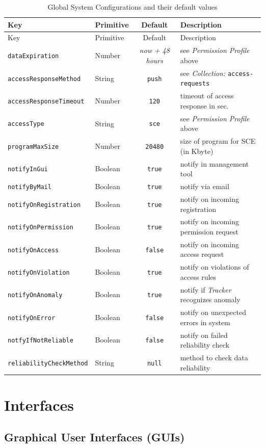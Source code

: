 \documentclass[12pt,english,a4paper,titlepage,cleardoublepage=empty,dottedtoc]{report}
\begin{document}
\begin{longtable}[]{@{}llcl@{}}
\caption{Global System Configurations and their default values
\label{tbl:spec_system-default-config}}\tabularnewline
\toprule
Key & Primitive & Default & Description\tabularnewline
\midrule
\endfirsthead
\toprule
Key & Primitive & Default & Description\tabularnewline
\midrule
\endhead
\texttt{dataExpiration} & Number & \emph{now + 48 hours} & see
\emph{Permission Profile} above\tabularnewline
\texttt{accessResponseMethod} & String &
\texttt{\textquotesingle{}push\textquotesingle{}} & see
\emph{Collection:} \texttt{access-requests}\tabularnewline
\texttt{accessResponseTimeout} & Number & \texttt{120} & timeout of
access response in sec.\tabularnewline
\texttt{accessType} & String &
\texttt{\textquotesingle{}sce\textquotesingle{}} & see \emph{Permission
Profile} above\tabularnewline
\texttt{programMaxSize} & Number & \texttt{20480} & size of program for
SCE (in Kbyte)\tabularnewline
\texttt{notifyInGui} & Boolean & \texttt{true} & notify in management
tool\tabularnewline
\texttt{notifyByMail} & Boolean & \texttt{true} & notify via
email\tabularnewline
\texttt{notifyOnRegistration} & Boolean & \texttt{true} & notify on
incoming registration\tabularnewline
\texttt{notifyOnPermission} & Boolean & \texttt{true} & notify on
incoming permission request\tabularnewline
\texttt{notifyOnAccess} & Boolean & \texttt{false} & notify on incoming
access request\tabularnewline
\texttt{notifyOnViolation} & Boolean & \texttt{true} & notify on
violations of access rules\tabularnewline
\texttt{notifyOnAnomaly} & Boolean & \texttt{true} & notify if
\emph{Tracker} recognizes anomaly\tabularnewline
\texttt{notifyOnError} & Boolean & \texttt{false} & notify on unexpected
errors in system\tabularnewline
\texttt{notfyIfNotReliable} & Boolean & \texttt{false} & notify on
failed reliability check\tabularnewline
\texttt{reliabilityCheckMethod} & String & \texttt{null} & method to
check data reliability\tabularnewline
\bottomrule
\end{longtable}

\section{Interfaces}\label{interfaces-1}

\subsection{Graphical User Interfaces
(GUIs)}\label{graphical-user-interfaces-guis}
\end{document}
